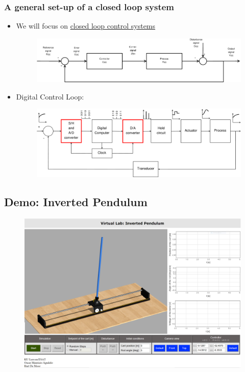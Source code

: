 \begin{frame}
	\frametitle{A general set-up of a closed loop system}
	\vspace*{-1em}
	\begin{itemize}
		\item We will focus on \underline{closed loop control systems}
		\begin{figure}
\centering
\includegraphics[width=0.7\linewidth]{Closed-Loop}
\label{fig:Closed-Loop}
\end{figure}
\item Digital Control Loop:
\begin{figure}
\centering
\includegraphics[width=0.6\linewidth]{digital-control-system}
\label{fig:digital-control-system}
\end{figure}

	\end{itemize}
\end{frame}

\subsection[Demo: Inverted Pendulum]{Demo: Inverted Pendulum}
\begin{frame}
	\begin{figure}
\centering
\href{http://homes.esat.kuleuven.be/~magudelo/_html5/test11.html}{\includegraphics[width=1\linewidth]{"inverted-pendulum/full"}}
\label{fig:InvertedPendulum}
\end{figure}
\end{frame}

